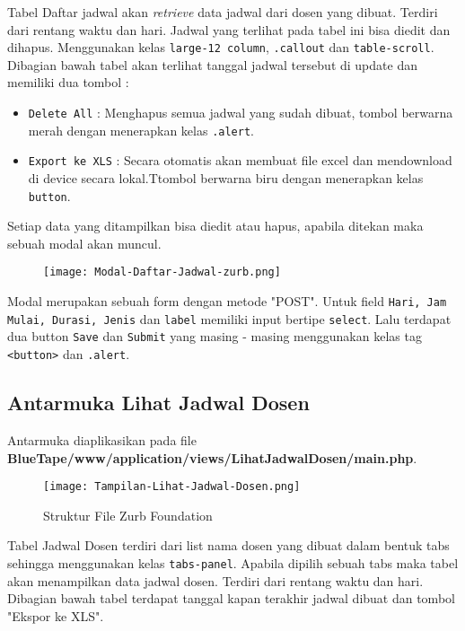Tabel Daftar jadwal akan \textit{retrieve} data jadwal dari dosen yang dibuat. Terdiri dari rentang waktu dan hari. Jadwal yang terlihat pada tabel ini bisa diedit dan dihapus. Menggunakan kelas \colorbox{mygray}{\texttt{large-12 column}}, \colorbox{mygray}{\texttt{.callout}} dan \texttt{table-scroll}.
Dibagian bawah tabel akan terlihat tanggal jadwal tersebut di update dan memiliki dua tombol :
\begin{itemize}
	\item \texttt{Delete All} : Menghapus semua jadwal yang sudah dibuat, tombol berwarna merah dengan menerapkan kelas \colorbox{mygray}{\texttt{.alert}}.
	\item \texttt{Export ke XLS} : Secara otomatis akan membuat file excel dan mendownload di device secara lokal.Ttombol berwarna biru dengan menerapkan kelas \texttt{button}.
\end{itemize}
Setiap data yang ditampilkan bisa diedit atau hapus, apabila ditekan maka sebuah modal akan muncul.  
\begin{figure} [H]
	\centering  
	\texttt{[image: Modal-Daftar-Jadwal-zurb.png]}  
	\caption{} 	
\end{figure}
Modal merupakan sebuah form dengan metode "POST". Untuk field \texttt{Hari, Jam Mulai, Durasi, Jenis} dan \texttt{label} memiliki input bertipe \colorbox{mygray}{\texttt{select}}. Lalu terdapat dua button \texttt{Save} dan \texttt{Submit} yang masing - masing menggunakan kelas tag \colorbox{mygray}{\texttt{<button>}} dan \colorbox{mygray}{\texttt{.alert}}.

\subsection{Antarmuka Lihat Jadwal Dosen}
Antarmuka diaplikasikan pada file \textbf{BlueTape/www/application/views/LihatJadwalDosen/main.php}.
\begin{figure} [H]
	\centering  
	\texttt{[image: Tampilan-Lihat-Jadwal-Dosen.png]}  
	\caption{Struktur File Zurb Foundation} 	
\end{figure}
Tabel Jadwal Dosen terdiri dari list nama dosen yang dibuat dalam bentuk tabs sehingga menggunakan kelas \colorbox{mygray}{\texttt{tabs-panel}}. Apabila dipilih sebuah tabs maka tabel akan menampilkan data jadwal dosen.  Terdiri dari rentang waktu dan hari. Dibagian bawah tabel terdapat tanggal kapan terakhir jadwal dibuat dan tombol "Ekspor ke XLS".
